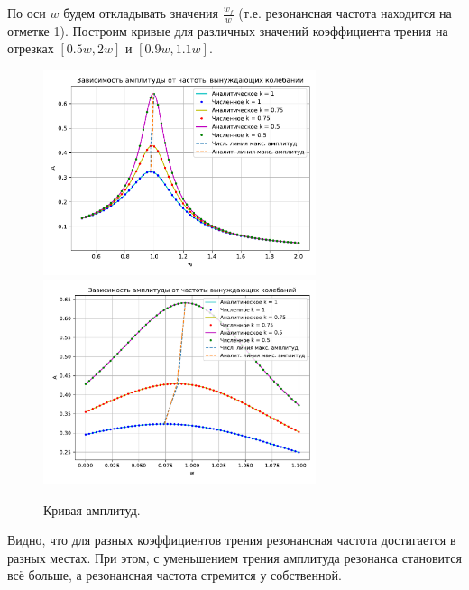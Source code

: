             По оси \( w \) будем откладывать значения \( \frac{w_f}{w} \) (т.е. резонансная частота находится на отметке 1). Построим кривые для различных значений коэффициента трения на отрезках \( [0.5 w, 2 w] \) и \( [0.9 w, 1.1 w] \).

            \begin{figure}[H]
                \centering
                \includegraphics[width=8cm]{pictures/6res05_20.pdf}
                \includegraphics[width=8cm]{pictures/6res09_11.pdf}
                \caption{Кривая амплитуд.}
            \end{figure}
            Видно, что для разных коэффициентов трения резонансная частота достигается в разных местах. При этом, с уменьшением трения амплитуда резонанса становится всё больше, а резонансная частота стремится у собственной.
            
